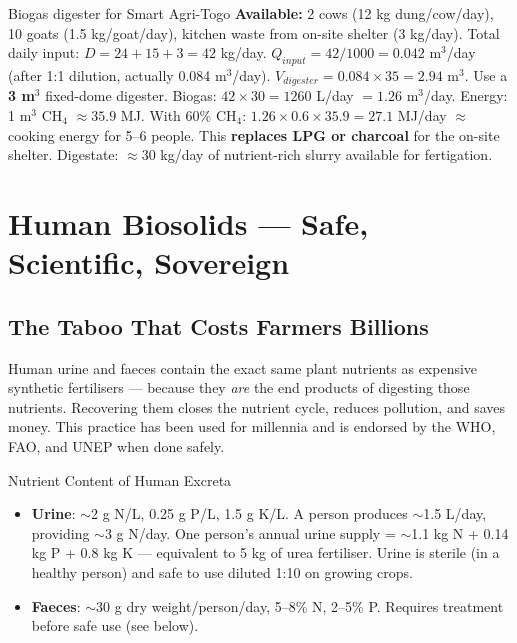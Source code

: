 \documentclass[12pt,a4paper,openany]{book}
\begin{document}
\begin{exbox}{Biogas digester for Smart Agri-Togo}
\textbf{Available:} 2 cows (12 kg dung/cow/day), 10 goats (1.5 kg/goat/day), kitchen waste from on-site shelter (3 kg/day).
Total daily input: $D = 24+15+3=42$ kg/day.
$Q_{input}=42/1000=0.042$ m$^3$/day (after 1:1 dilution, actually 0.084 m$^3$/day).
$V_{digester}=0.084\times35=2.94$ m$^3$. Use a \textbf{3 m$^3$} fixed-dome digester.
Biogas: $42\times30=1260$ L/day $=1.26$ m$^3$/day.
Energy: 1 m$^3$ CH$_4$ $\approx35.9$ MJ. With 60\% CH$_4$: $1.26\times0.6\times35.9=27.1$ MJ/day $\approx$ cooking energy for 5--6 people. This \textbf{replaces LPG or charcoal} for the on-site shelter.
Digestate: $\approx30$ kg/day of nutrient-rich slurry available for fertigation.
\end{exbox}

\chapter{Human Biosolids — Safe, Scientific, Sovereign}
\label{chap:biosolids}

\section{The Taboo That Costs Farmers Billions}

Human urine and faeces contain the exact same plant nutrients as expensive synthetic fertilisers — because they \textit{are} the end products of digesting those nutrients. Recovering them closes the nutrient cycle, reduces pollution, and saves money. This practice has been used for millennia and is endorsed by the WHO, FAO, and UNEP when done safely.

\begin{biobox}{Nutrient Content of Human Excreta}
\begin{itemize}[leftmargin=1.5em]
  \item \textbf{Urine}: $\sim$2 g N/L, 0.25 g P/L, 1.5 g K/L. A person produces $\sim$1.5 L/day, providing $\sim$3 g N/day. One person's annual urine supply = $\sim$1.1 kg N + 0.14 kg P + 0.8 kg K — equivalent to 5 kg of urea fertiliser. Urine is sterile (in a healthy person) and safe to use diluted 1:10 on growing crops.
  \item \textbf{Faeces}: $\sim$30 g dry weight/person/day, 5--8\% N, 2--5\% P. Requires treatment before safe use (see below).
\end{itemize}
\end{biobox}
\end{document}

